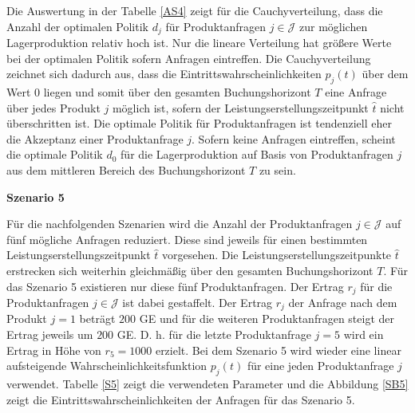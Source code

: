 Die Auswertung in der Tabelle \ref{AS4} zeigt für die Cauchyverteilung, dass die Anzahl der optimalen Politik $d_j$ für Produktanfragen $j\in\mathcal{J}$ zur möglichen Lagerproduktion relativ hoch ist. Nur die lineare Verteilung hat größere Werte bei der optimalen Politik sofern Anfragen eintreffen. Die Cauchyverteilung zeichnet sich dadurch aus, dass die Eintrittswahrscheinlichkeiten $p_j(t)$ über dem Wert $0$ liegen und somit über den gesamten Buchungshorizont $T$ eine Anfrage über jedes Produkt $j$ möglich ist, sofern der Leistungserstellungszeitpunkt $\hat t$ nicht überschritten ist. Die optimale Politik für Produktanfragen ist tendenziell eher die Akzeptanz einer Produktanfrage $j$. Sofern keine Anfragen eintreffen, scheint die optimale Politik $d_0$ für die Lagerproduktion auf Basis von Produktanfragen $j$ aus dem mittleren Bereich des Buchungshorizont $T$ zu sein.

\textbf{Szenario 5}

Für die nachfolgenden Szenarien wird die Anzahl der Produktanfragen $j\in\mathcal{J}$ auf fünf mögliche Anfragen reduziert. Diese sind jeweils für einen bestimmten Leistungserstellungszeitpunkt $\hat t$ vorgesehen. Die Leistungserstellungszeitpunkte $\hat t$ erstrecken sich weiterhin gleichmäßig über den gesamten Buchungshorizont $T$. Für das Szenario 5 existieren nur diese fünf Produktanfragen. Der Ertrag $r_j$ für die Produktanfragen $j\in\mathcal{J}$ ist dabei gestaffelt. Der Ertrag $r_j$ der Anfrage nach dem Produkt $j=1$ beträgt $200$ GE und für die weiteren Produktanfragen steigt der Ertrag jeweils um $200$ GE. D. h. für die letzte Produktanfrage $j=5$ wird ein Ertrag in Höhe von $r_5=1000$ erzielt. Bei dem Szenario 5 wird wieder eine linear aufsteigende Wahrscheinlichkeitsfunktion $p_j(t)$ für eine jeden Produktanfrage $j$ verwendet. Tabelle \ref{S5} zeigt die verwendeten Parameter und die Abbildung \ref{SB5} zeigt die Eintrittswahrscheinlichkeiten der Anfragen für das Szenario 5.\\

